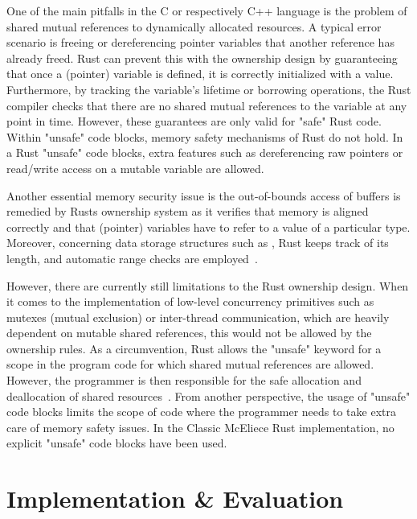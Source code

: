 \documentclass[11pt,
  oneside,openany,    %
]{scrreprt}
\begin{document}
One of the main pitfalls in the C or respectively C++ language is the problem of shared mutual references to dynamically allocated resources. A typical error scenario is freeing or dereferencing pointer variables that another reference has already freed. Rust can prevent this with the ownership design by guaranteeing that once a (pointer) variable is defined, it is correctly initialized with a value. Furthermore, by tracking the variable's lifetime or borrowing operations, the Rust compiler checks that there are no shared mutual references to the variable at any point in time. However, these guarantees are only valid for "safe" Rust code. Within "unsafe" code blocks, memory safety mechanisms of Rust do not hold. In a Rust "unsafe" code blocks, extra features such as dereferencing raw pointers or read/write access on a mutable variable are allowed.

Another essential memory security issue is the out-of-bounds access of buffers
is remedied by Rusts ownership system as it verifies that memory is aligned correctly and that (pointer) variables have to refer to a value of a particular type. Moreover, concerning data storage structures such as , Rust keeps track of its length, and automatic range checks are employed~\cite{memsafetyHui}.

However, there are currently still limitations to the Rust ownership design.
When it comes to the implementation of low-level concurrency primitives such
as mutexes (mutual exclusion) or inter-thread communication, which are heavily dependent on mutable shared references, this would not be allowed by the ownership rules. As a circumvention, Rust allows the "unsafe" keyword for a scope in the program code for which shared mutual references are allowed. However, the programmer is then responsible for the safe allocation and deallocation of shared resources~\cite{rustForRustaceans, RustBelt, rustBook}.
From another perspective, the usage of "unsafe" code blocks limits the scope of code where the programmer needs to take extra care of memory safety issues. In the Classic McEliece Rust implementation, no explicit "unsafe" code blocks have been used.


\chapter{Implementation \& Evaluation}
\label{chap:impl_eval}
\end{document}
